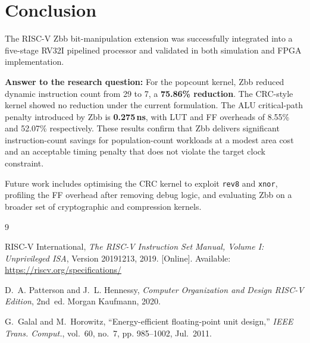 \documentclass[conference]{IEEEtran}
\begin{document}
	\section{Conclusion}
	\label{sec:conclusion}
	
	The RISC-V Zbb bit-manipulation extension was successfully integrated into a
	five-stage RV32I pipelined processor and validated in both simulation and
	FPGA implementation.
	
	\textbf{Answer to the research question:}
	For the popcount kernel, Zbb reduced dynamic instruction count from 29 to 7,
	a \textbf{75.86\% reduction}.
	The CRC-style kernel showed no reduction under the current formulation.
	The ALU critical-path penalty introduced by Zbb is \textbf{0.275\,ns},
	with LUT and FF overheads of 8.55\% and 52.07\% respectively.
	These results confirm that Zbb delivers significant instruction-count savings
	for population-count workloads at a modest area cost and an acceptable
	timing penalty that does not violate the target clock constraint.
	
	Future work includes optimising the CRC kernel to exploit \texttt{rev8} and
	\texttt{xnor}, profiling the FF overhead after removing debug logic, and
	evaluating Zbb on a broader set of cryptographic and compression kernels.
	
	\begin{thebibliography}{9}
		
		RISC-V International,
		\textit{The RISC-V Instruction Set Manual, Volume I: Unprivileged ISA},
		Version 20191213, 2019.
		[Online]. Available: \url{https://riscv.org/specifications/}
		
		D.~A. Patterson and J.~L. Hennessy,
		\textit{Computer Organization and Design RISC-V Edition},
		2nd~ed. Morgan Kaufmann, 2020.
		
		G.~Galal and M.~Horowitz,
		``Energy-efficient floating-point unit design,''
		\textit{IEEE Trans. Comput.}, vol.~60, no.~7, pp. 985--1002, Jul.~2011.
		
	\end{thebibliography}
	
\end{document}
